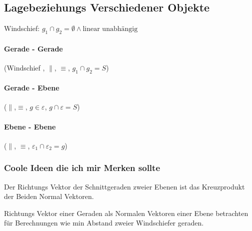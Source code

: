 \subsection*{ Lagebeziehungs Verschiedener Objekte } 

Windschief: \( g_1 \cap g_2 = \emptyset \land \text{linear unabhängig} \)


\paragraph*{ Gerade - Gerade } (Windschief , \( \parallel \), \( \equiv \), \( g_1 \cap g_2 = S \))

\paragraph*{ Gerade - Ebene} (\( \parallel \),\( \equiv \), \( g \in \varepsilon \), \( g \cap \varepsilon = S \))

\paragraph*{ Ebene - Ebene} (\( \parallel \), \( \equiv \), \( \varepsilon_1 \cap \varepsilon_2 = g \))

\subsubsection*{ Coole Ideen die ich mir Merken sollte}

Der Richtungs Vektor der Schnittgeraden zweier Ebenen ist das Kreuzprodukt der Beiden Normal Vektoren. \newline

Richtungs Vektor einer Geraden als Normalen Vektoren einer Ebene betrachten für Berechnungen wie min Abstand zweier Windschiefer geraden.


